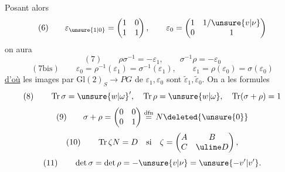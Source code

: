 Posant alors
\[
(6)\qquad \varepsilon_{\unsure{1|0}}=\begin{pmatrix}1&0\\1&1\end{pmatrix},\qquad \varepsilon_0=\begin{pmatrix}1&1/\unsure{v|\nu}\\0&1\end{pmatrix}
\]
on aura
\[
(7)\qquad \rho\sigma^{-1}=-\varepsilon_1,\qquad\sigma^{-1}\rho=-\varepsilon_0
\]
\[
(7\mathrm{bis})\qquad \varepsilon_0=\rho^{-1}(\varepsilon_1)=\sigma^{-1}(\varepsilon_1),\qquad\varepsilon_1=\rho(\varepsilon_0)=\sigma(\varepsilon_0)
\]
\uline{d'où} les images par $\mathrm{Gl}(2)_S\longrightarrow PG$ de  $\varepsilon_1,\varepsilon_0$ sont $\widetilde\varepsilon_1,\widetilde\varepsilon_0$. On a les formules
\[
(8)\qquad \operatorname{Tr}\sigma=\unsure{w|\omega}',\quad\operatorname{Tr}\rho=\unsure{w|\omega},\quad\operatorname{Tr}(\sigma+\rho)=1
\]
\[
(9)\qquad \sigma+\rho=\begin{pmatrix}0&0\\0&1\end{pmatrix}\overset{\mathrm{dfn}}=N\deleted{\unsure{0}}
\]
\[
(10)\qquad \operatorname{Tr}\zeta N=D\quad\text{si}\quad\zeta=\begin{pmatrix}A&B\\C&\uline D\end{pmatrix},
\]
\[
(11)\qquad \det\sigma=\det\rho=-\unsure{v|\nu}=\unsure{-v'|v'}.
\]

